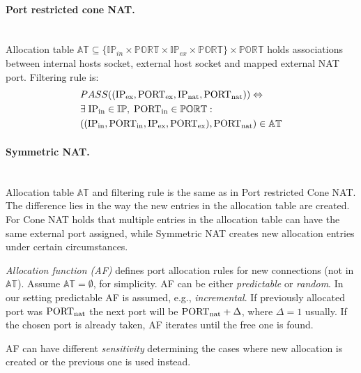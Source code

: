 \documentclass{llncs}
\begin{document}
\paragraph{Port restricted cone NAT.} ~\\
Allocation table $\mathbb{AT} \subseteq \{\mathbb{IP}_{in} \times \mathbb{PORT} \times \mathbb{IP}_{ex} \times \mathbb{PORT}\} \times \mathbb{PORT}$ 
holds associations between internal hosts socket, external host socket and mapped external NAT port. 
Filtering rule is:
\begin{align*}
& PASS((\text{IP\textsubscript{ex}}, \text{PORT\textsubscript{ex}}, \text{IP\textsubscript{nat}}, \text{PORT\textsubscript{nat}} )) \Leftrightarrow \\
&  \exists \; \text{IP\textsubscript{in}} \in \mathbb{IP}, \; \text{PORT\textsubscript{in}} \in \mathbb{PORT}:\\
& ((\text{IP\textsubscript{in}}, \text{PORT\textsubscript{in}}, \text{IP\textsubscript{ex}}, \text{PORT\textsubscript{ex}}), \text{PORT\textsubscript{nat}} ) \in \mathbb{AT}
\end{align*}

\paragraph{Symmetric NAT.} ~\\
Allocation table $\mathbb{AT}$ and filtering rule is the same as in Port restricted Cone NAT. The difference lies in the way 
the new entries in the allocation table are created. For Cone NAT holds that multiple entries in the allocation table 
can have the same external port assigned, while Symmetric NAT creates new allocation entries under certain circumstances.

\emph{Allocation function (AF)} defines port allocation rules for new connections (not in $\mathbb{AT}$). Assume $\mathbb{AT}=\emptyset$, for simplicity. 
AF can be either \emph{predictable} or \emph{random}. In our setting predictable AF is assumed, e.g., \emph{incremental}. 
If previously allocated port was $\text{PORT\textsubscript{nat}}$
the next port will be $\text{PORT\textsubscript{nat}}+\Delta$, where $\Delta=1$ usually.
If the chosen port is already taken, AF iterates until the free one is found.

AF can have different \emph{sensitivity} determining the cases where new allocation is created or the previous one is used instead.
\end{document}
